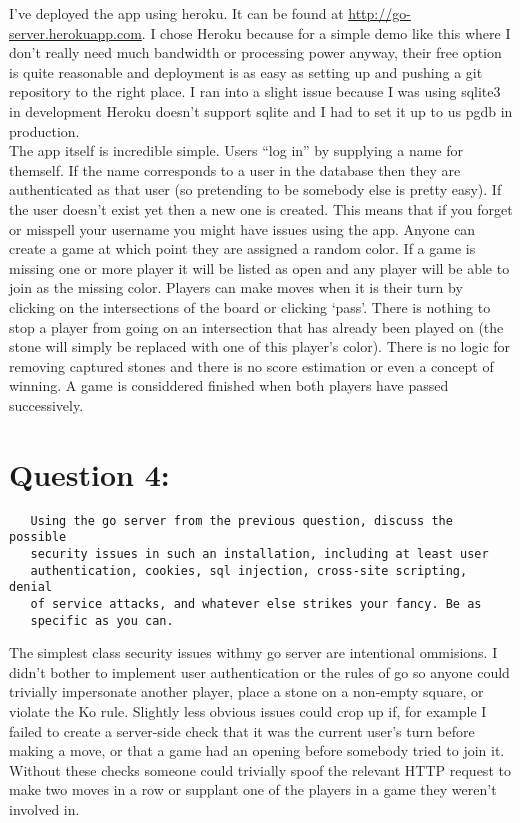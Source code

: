 \documentclass[11pt]{article}
\begin{document}
  I've deployed the app using heroku.  It can be found at
  \href{http://go-server.herokuapp.com}{http://go-server.herokuapp.com}.  I chose Heroku because for a simple
  demo like this where I don't really need much bandwidth or
  processing power anyway, their free option is quite reasonable and
  deployment is as easy as setting up and pushing a git repository to
  the right place.  I ran into a slight issue because I was using
  sqlite3 in development Heroku doesn't support sqlite and I had to
  set it up to us pgdb in production. \\
  
  The app itself is incredible simple.  Users ``log in'' by supplying a
  name for themself.  If the name corresponds to a user in the
  database then they are authenticated as that user (so pretending to
  be somebody else is pretty easy).  If the user doesn't exist yet
  then a new one is created.  This means that if you forget or
  misspell your username you might have issues using the app.  Anyone
  can create a game at which point they are assigned a random color.
  If a game is missing one or more player it will be listed as open
  and any player will be able to join as the missing color.  Players
  can make moves when it is their turn by clicking on the
  intersections of the board or clicking `pass'.  There is nothing to
  stop a player from going on an intersection that has already been
  played on (the stone will simply be replaced with one of this
  player's color).  There is no logic for removing captured stones and
  there is no score estimation or even a concept of winning.  A game
  is considdered finished when both players have passed successively.
  
\section*{Question 4:}
\label{sec-4}

  
\begin{verbatim}
   Using the go server from the previous question, discuss the possible
   security issues in such an installation, including at least user
   authentication, cookies, sql injection, cross-site scripting, denial
   of service attacks, and whatever else strikes your fancy. Be as
   specific as you can.
\end{verbatim}

  
  The simplest class security issues withmy go server are intentional
  ommisions.  I didn't bother to implement user authentication or the
  rules of go so anyone could trivially impersonate another player,
  place a stone on a non-empty square, or violate the Ko rule.
  Slightly less obvious issues could crop up if, for example I failed
  to create a server-side check that it was the current user's turn
  before making a move, or that a game had an opening before somebody
  tried to join it.  Without these checks someone could trivially
  spoof the relevant HTTP request to make two moves in a row or
  supplant one of the players in a game they weren't involved in. \\
  
\end{document}
